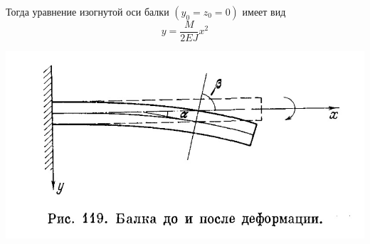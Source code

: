 Тогда уравнение изогнутой оси балки $(y_0 = z_0 = 0)$ имеет вид
$$ y = \frac{M}{2EJ}x^2 $$

\includegraphics[scale=0.5]{20/t21_3.jpg}
